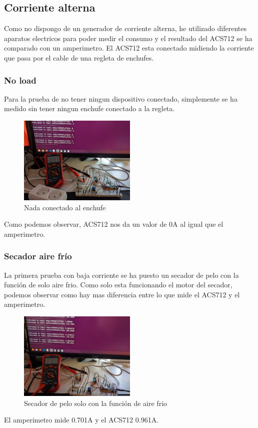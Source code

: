 \begin{titlepage}
\subsection{Corriente alterna}
Como no dispongo de un generador de corriente alterna, he utilizado diferentes aparatos electricos para poder medir el consumo y el resultado del ACS712 se ha comparado con un amperimetro. El ACS712 esta conectado midiendo la corriente que pasa por el cable de una regleta de enchufes.\\
\subsubsection{No load}
Para la prueba de no tener ningun dispositivo conectado, simplemente se ha medido sin tener ningun enchufe conectado a la regleta.\\
\begin{figure}[h!]
	\centering
	\includegraphics[width=0.5\textwidth]{imagenes/AC_noload.jpg}
	\caption{Nada conectado al enchufe}
\end{figure}
Como podemos observar, ACS712 nos da un valor de 0A al igual que el amperimetro.

\subsubsection{Secador aire frío}
La primera prueba con baja corriente se ha puesto un secador de pelo con la función de solo aire frio. Como solo esta funcionando el motor del secador, podemos observar como hay mas diferencia entre lo que mide el ACS712 y el amperimetro. \\
\begin{figure}[h!]
	\centering
	\includegraphics[width=0.5\textwidth]{imagenes/AC_O_7Amps.jpg}
	\caption{Secador de pelo solo con la función de aire frio}
\end{figure}
El amperimetro mide 0.701A y el ACS712 0.961A. \\


\end{titlepage}
